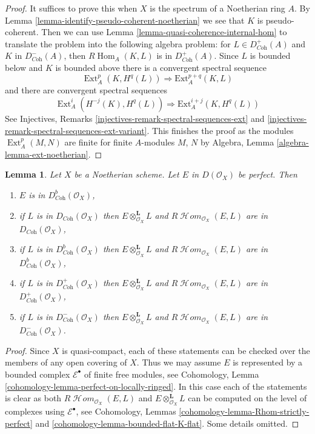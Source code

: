 \documentclass{stacks-project}
\theoremstyle{plain}
\newtheorem{lemma}[subsection]{Lemma}
\theoremstyle{definition}
\theoremstyle{remark}
\numberwithin{equation}{subsection}
\def\Hom{\mathop{\mathrm{Hom}}\nolimits}
\def\Ext{\mathop{\mathrm{Ext}}\nolimits}
\def\SheafHom{\mathop{\mathcal{H}\!\mathit{om}}\nolimits}
\begin{document}
\begin{proof}
It suffices to prove this when $X$ is the spectrum of
a Noetherian ring $A$.
By Lemma \ref{lemma-identify-pseudo-coherent-noetherian}
we see that $K$ is pseudo-coherent.
Then we can use Lemma \ref{lemma-quasi-coherence-internal-hom}
to translate the problem into the following algebra problem:
for $L \in D^+_{\textit{Coh}}(A)$ and $K$ in $D^-_{\textit{Coh}}(A)$, then
$R\Hom_A(K, L)$ is in $D^+_{\textit{Coh}}(A)$.
Since $L$ is bounded below and $K$ is bounded above there is a
convergent spectral sequence
$$
\Ext^p_A(K, H^q(L)) \Rightarrow \text{Ext}^{p + q}_A(K, L)
$$
and there are convergent spectral sequences
$$
\Ext^i_A(H^{-j}(K), H^q(L)) \Rightarrow \text{Ext}^{i + j}_A(K, H^q(L))
$$
See Injectives, Remarks \ref{injectives-remark-spectral-sequences-ext}
and \ref{injectives-remark-spectral-sequences-ext-variant}.
This finishes the proof as the modules $\Ext^p_A(M, N)$
are finite for finite $A$-modules $M$, $N$ by
Algebra, Lemma \ref{algebra-lemma-ext-noetherian}.
\end{proof}

\begin{lemma}
\label{lemma-perfect-on-noetherian}
Let $X$ be a Noetherian scheme. Let $E$ in $D(\mathcal{O}_X)$ be perfect.
Then
\begin{enumerate}
\item $E$ is in $D^b_{\textit{Coh}}(\mathcal{O}_X)$,
\item if $L$ is in $D_{\textit{Coh}}(\mathcal{O}_X)$ then
$E \otimes_{\mathcal{O}_X}^\mathbf{L} L$ and
$R\SheafHom_{\mathcal{O}_X}(E, L)$ are in
$D_{\textit{Coh}}(\mathcal{O}_X)$,
\item if $L$ is in $D^b_{\textit{Coh}}(\mathcal{O}_X)$ then
$E \otimes_{\mathcal{O}_X}^\mathbf{L} L$ and
$R\SheafHom_{\mathcal{O}_X}(E, L)$ are in
$D^b_{\textit{Coh}}(\mathcal{O}_X)$,
\item if $L$ is in $D^+_{\textit{Coh}}(\mathcal{O}_X)$ then
$E \otimes_{\mathcal{O}_X}^\mathbf{L} L$ and
$R\SheafHom_{\mathcal{O}_X}(E, L)$ are in
$D^+_{\textit{Coh}}(\mathcal{O}_X)$,
\item if $L$ is in $D^-_{\textit{Coh}}(\mathcal{O}_X)$ then
$E \otimes_{\mathcal{O}_X}^\mathbf{L} L$ and
$R\SheafHom_{\mathcal{O}_X}(E, L)$ are in
$D^-_{\textit{Coh}}(\mathcal{O}_X)$.
\end{enumerate}
\end{lemma}

\begin{proof}
Since $X$ is quasi-compact, each of these statements can be checked
over the members of any open covering of $X$.
Thus we may assume $E$ is represented by
a bounded complex $\mathcal{E}^\bullet$ of finite free modules, see
Cohomology, Lemma \ref{cohomology-lemma-perfect-on-locally-ringed}.
In this case each of the statements is clear as both
$R\SheafHom_{\mathcal{O}_X}(E, L)$
and $E \otimes_{\mathcal{O}_X}^\mathbf{L} L$ can be computed on the
level of complexes using $\mathcal{E}^\bullet$, see
Cohomology, Lemmas \ref{cohomology-lemma-Rhom-strictly-perfect} and
\ref{cohomology-lemma-bounded-flat-K-flat}. Some details omitted.
\end{proof}
\end{document}
